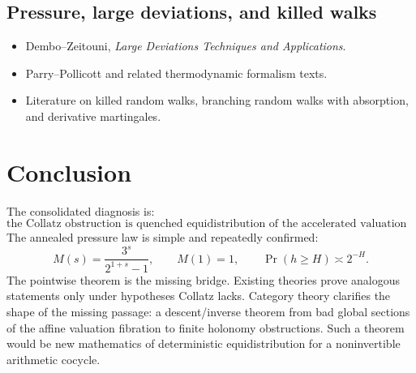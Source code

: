 \documentclass[11pt]{article}
\begin{document}
\subsection{Pressure, large deviations, and killed walks}
\begin{itemize}[leftmargin=2em]
\item Dembo--Zeitouni, \emph{Large Deviations Techniques and Applications}.
\item Parry--Pollicott and related thermodynamic formalism texts.
\item Literature on killed random walks, branching random walks with absorption, and derivative martingales.
\end{itemize}

\section{Conclusion}

The consolidated diagnosis is:
\[
\boxed{
\text{the Collatz obstruction is quenched equidistribution of the accelerated valuation cocycle.}
}
\]
The annealed pressure law is simple and repeatedly confirmed:
\[
M(s)=\frac{3^s}{2^{1+s}-1},
\qquad M(1)=1,
\qquad \Pr(h\ge H)\asymp2^{-H}.
\]
The pointwise theorem is the missing bridge.  Existing theories prove analogous statements only under hypotheses Collatz lacks.  Category theory clarifies the shape of the missing passage: a descent/inverse theorem from bad global sections of the affine valuation fibration to finite holonomy obstructions.  Such a theorem would be new mathematics of deterministic equidistribution for a noninvertible arithmetic cocycle.
\end{document}
